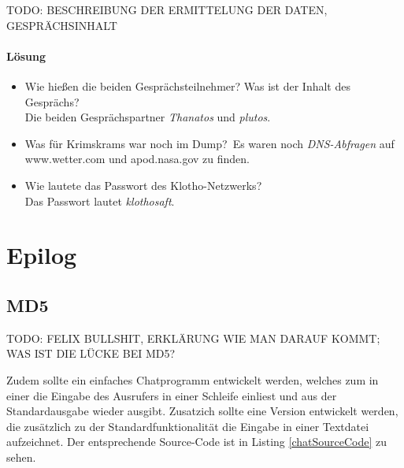 \documentclass[12pt]{article}
\begin{document}
TODO: BESCHREIBUNG DER ERMITTELUNG DER DATEN, GESPRÄCHSINHALT

\paragraph{Lösung}
\begin{itemize}
	\item Wie hießen die beiden Gesprächsteilnehmer? Was ist der Inhalt des Gesprächs?\\
		Die beiden Gesprächspartner \textit{Thanatos} und \textit{plutos}.
	\item Was für Krimskrams war noch im Dump?\
		Es waren noch \textit{DNS-Abfragen} auf www.wetter.com und apod.nasa.gov zu finden.
	\item Wie lautete das Passwort des Klotho-Netzwerks?\\
		Das Passwort lautet \textit{klothosaft}.
\end{itemize}

\section{Epilog}

\subsection{MD5}

TODO: FELIX BULLSHIT, ERKLÄRUNG WIE MAN DARAUF KOMMT; WAS IST DIE LÜCKE BEI MD5?


Zudem sollte ein einfaches Chatprogramm entwickelt werden, welches zum in einer die Eingabe des Ausrufers in einer Schleife einliest und aus der Standardausgabe wieder ausgibt. Zusatzich sollte eine Version entwickelt werden, die zusätzlich zu der Standardfunktionalität die Eingabe in einer Textdatei aufzeichnet. Der entsprechende Source-Code ist in Listing \ref{chatSourceCode} zu sehen. \\
\end{document}
